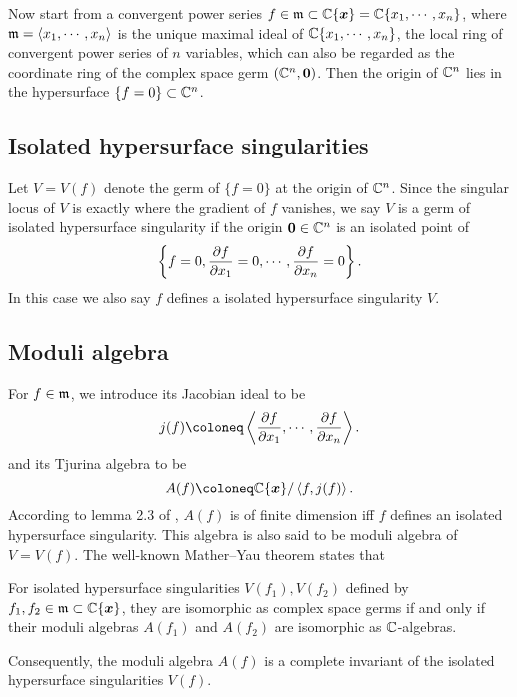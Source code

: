 
Now start from a convergent power series $f\in \mathfrak m \subset {\mathbb{C}}\{{\boldsymbol{x}}\}={\mathbb{C}}\{x_1,\cdots, x_n\}$, where $\mathfrak m = \left\langle x_1,\cdots, x_n\right\rangle$ is the unique maximal ideal of ${\mathbb{C}}\{x_1,\cdots,x_n\}$, the local ring of convergent power series of $n$ variables, which can also be regarded as the coordinate ring of the complex space germ $({\mathbb{C}}^n,{\boldsymbol 0})$. Then the origin of ${\mathbb{C}}^n$ lies in the hypersurface $\{ f = 0\} \subset {\mathbb{C}}^n$.

\subsection{Isolated hypersurface singularities} Let $V=V(f)$ denote the germ of $\{f=0\}$ at the origin of ${\mathbb{C}}^n$. Since the singular locus of $V$ is exactly where the gradient of $f$ vanishes, we say $V$ is a germ of isolated hypersurface singularity if the origin ${\boldsymbol 0}\in {\mathbb{C}}^n$  is an isolated point of 
$$\left\{f=0,\frac{\partial f}{\partial x_1}=0,\cdots, \frac{\partial f}{\partial x_n}=0\right\}.$$
In this case we also say $f$ defines a isolated hypersurface singularity $V$.

\subsection{Moduli algebra}\label{sec-2.2}
For $f\in \mathfrak m$, we introduce its Jacobian ideal to be 
\[j(f)\coloneq \lan \pd f{x_1},\cdots, \pd f {x_n}\ran.\]
and its Tjurina algebra to be 
\[A(f)\coloneq  \Cc\{\xn\} / \lan f, j(f)\ran.\]
According to lemma 2.3 of \cite[113]{GL}, $A(f)$ is of finite dimension iff $f$ defines an isolated hypersurface singularity. This algebra is also said to be  moduli algebra of $V=V(f)$. The well-known Mather--Yau theorem states that 

\begin{theorem}[\cite{MY}]\label{MY}
  For  isolated hypersurface singularities $V(f_1), V(f_2)$ defined by $f_1,f_2\in \mathfrak m\subset {\mathbb{C}}\{{\boldsymbol{x}}\}$, they are isomorphic as complex space germs if and only if their moduli algebras $A(f_1)$ and $A(f_2)$ are isomorphic as ${\mathbb{C}}$-algebras.
\end{theorem}
Consequently, the moduli algebra $A(f)$ is a complete invariant of the isolated hypersurface singularities $V(f)$. 


